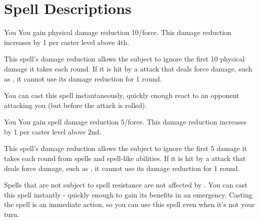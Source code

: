 \section{Spell Descriptions}

\small

\begin{comment}
\subsubsection{A}
\end{comment}

\begin{spelltarget}{You}
    \spelleffect You gain physical damage reduction 10/force. This damage reduction increases by 1 per caster level above 4th.
\end{spelltarget}
\spellnotes This spell's damage reduction allows the subject to ignore the first 10 physical damage it takes each round. If it is hit by a attack that deals force damage, such as , it cannot use its damage reduction for 1 round.

You can cast this spell instantaneously, quickly enough react to an opponent attacking you (but before the attack is rolled).

\begin{spelltarget}{You}
    \spelleffect You gain spell damage reduction 5/force. This damage reduction increases by 1 per caster level above 2nd.
\end{spelltarget}
\spellnotes This spell's damage reduction allows the subject to ignore the first 5 damage it takes each round from spells and spell-like abilities. If it is hit by a attack that deals force damage, such as , it cannot use its damage reduction for 1 round.

Spells that are not subject to spell resistance are not affected by . You can cast this spell instantly - quickly enough to gain its benefits in an emergency. Casting the spell is an immediate action, so you can use this spell even when it's not your turn.

